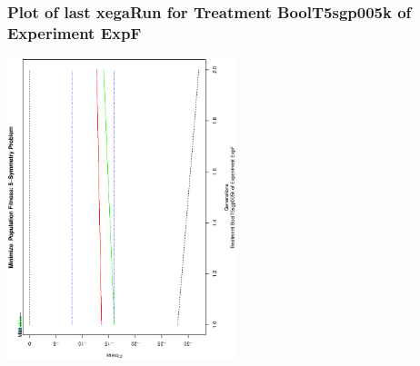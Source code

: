  \begin{frame}
 \frametitle{ Plot of last xegaRun for Treatment BoolT5sgp005k of Experiment ExpF }
 \begin{center}
\includegraphics[width=0.5\textwidth, angle=-90]
{ExpFPlotPopStatsFigure003.eps}
 \end{center}
 \label{templateReport/ExpFPlotPopStatsFigure003.eps}  
 \end{frame}

